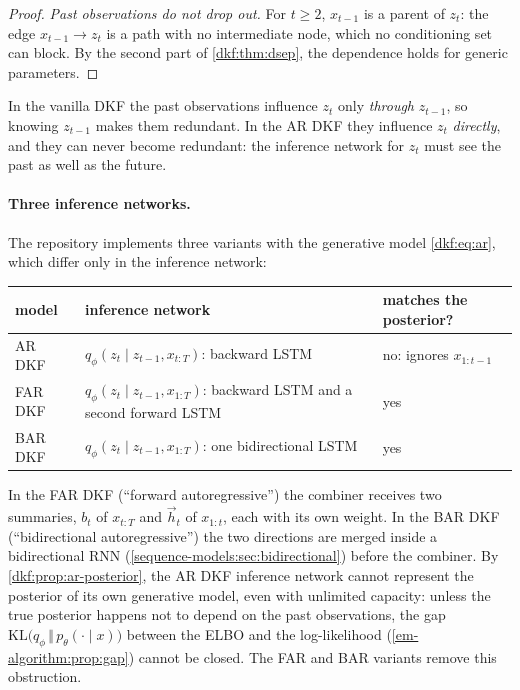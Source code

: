 \begin{notechapter}
\begin{proof}
\emph{Past observations do not drop out.} For $t\geq2$, $x_{t-1}$ is a parent of $z_t$: the edge $x_{t-1}\to z_t$ is a path with no
intermediate node, which no conditioning set can block. By the second part of
\cref{dkf:thm:dsep}, the dependence holds for generic parameters.
\end{proof}

In the vanilla DKF the past observations influence $z_t$ only \emph{through} $z_{t-1}$, so knowing $z_{t-1}$ makes
them redundant. In the AR DKF they influence $z_t$ \emph{directly}, and they can never become
redundant: the inference network for $z_t$ must see the past as well as the future.

\paragraph{Three inference networks.} The repository implements three variants with the
generative model \eqref{dkf:eq:ar}, which differ only in the inference network:
\begin{center}\small
\begin{tabular}{lp{}l}
\textbf{model} & \textbf{inference network} & \textbf{matches the posterior?}\\\hline
AR DKF & $q_\phi(z_t\mid z_{t-1}, x_{t:T})$: backward LSTM & no: ignores $x_{1:t-1}$\\
FAR DKF & $q_\phi(z_t\mid z_{t-1}, x_{1:T})$: backward LSTM and a second forward LSTM & yes\\
BAR DKF & $q_\phi(z_t\mid z_{t-1}, x_{1:T})$: one bidirectional LSTM & yes
\end{tabular}
\end{center}
In the FAR DKF (``forward autoregressive'') the combiner receives two summaries, $b_t$ of $x_{t:T}$ and
$\overrightarrow h_t$ of $x_{1:t}$, each with its own weight. In the BAR DKF (``bidirectional autoregressive'') the two
directions are merged inside a bidirectional RNN (\cref{sequence-models:sec:bidirectional}) before the
combiner. By \cref{dkf:prop:ar-posterior}, the AR DKF inference network cannot represent the
posterior of its own generative model, even with unlimited capacity: unless the true
posterior happens not to depend on the past observations, the gap
$\mathrm{KL}\bigl(q_\phi\,\Vert\,p_\theta(\cdot\mid x)\bigr)$ between the ELBO and the log-likelihood (\cref{em-algorithm:prop:gap}) cannot be
closed. The FAR and BAR variants remove this obstruction.


\end{notechapter}
